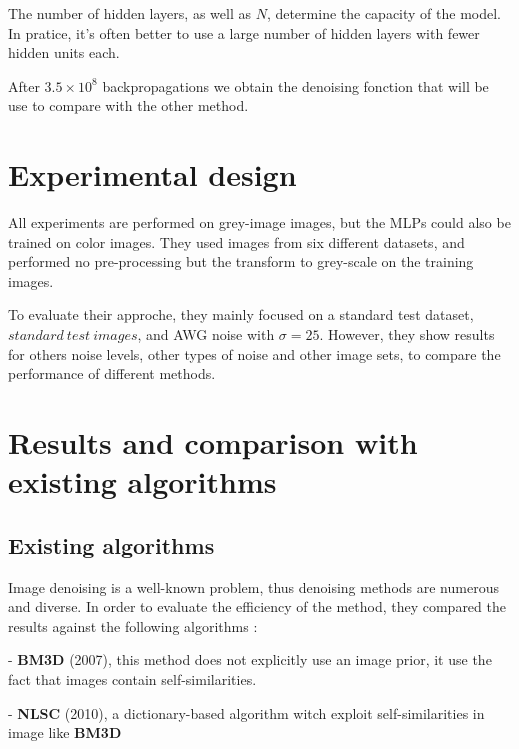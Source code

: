 \documentclass[10pt,a4paper]{article}
\newcommand{\svs}{\vspace{9pt}}
\begin{document}
The number of hidden layers, as well as $N$, determine the capacity of the model. In pratice, it's often better to use a large number of hidden layers with fewer hidden units each.

\svs
After $3.5 \times 10^8$ backpropagations we obtain the denoising fonction that will be use to compare with the other method.

\svs

\section{Experimental design}

All experiments are performed on grey-image images, but the MLPs could also be trained on color images. They used images from six different datasets, and performed no pre-processing but the transform to grey-scale on the training images. 

\svs 

To evaluate their approche, they mainly focused on a standard test dataset, $standard\ test\ images$, and AWG noise with $\sigma=25$. However, they show results for others noise levels, other types of noise and other image sets, to compare the performance of different methods.




\section{Results and comparison with existing algorithms}



\subsection{Existing algorithms}

Image denoising is a well-known problem, thus denoising methods are numerous and diverse. In order to evaluate the efficiency of the method, they compared the results against the following algorithms :

\svs
- \textbf{BM3D} (2007), this method does not explicitly use an image prior, it use the fact that images contain self-similarities.
\svs

- \textbf{NLSC} (2010), a dictionary-based algorithm witch exploit self-similarities in image like \textbf{BM3D}
\end{document}
